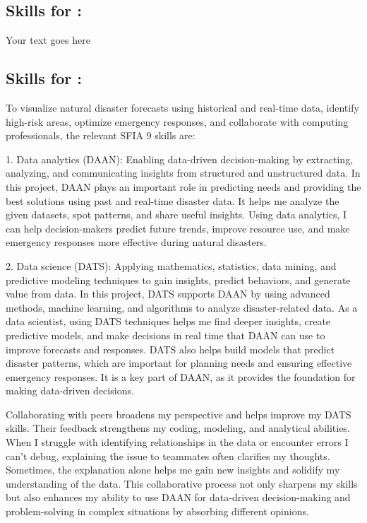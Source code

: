 \documentclass[a4paper, 11pt]{report}
\begin{document}
\subsection{Skills for \majA: \studA}

Your text goes here

\subsection{Skills for \majB: \studB}

To visualize natural disaster forecasts using historical and real-time data, identify high-risk areas, optimize emergency responses, and collaborate with computing professionals, the relevant SFIA 9 skills are:

1. Data analytics (DAAN): Enabling data-driven decision-making by extracting, analyzing, and communicating insights from structured and unstructured data. In this project, DAAN plays an important role in predicting needs and providing the best solutions using past and real-time disaster data. It helps me analyze the given datasets, spot patterns, and share useful insights. Using data analytics, I can help decision-makers predict future trends, improve resource use, and make emergency responses more effective during natural disasters.


2. Data science (DATS): Applying mathematics, statistics, data mining, and predictive modeling techniques to gain insights, predict behaviors, and generate value from data. In this project, DATS supports DAAN by using advanced methods, machine learning, and algorithms to analyze disaster-related data. As a data scientist, using DATS techniques helps me find deeper insights, create predictive models, and make decisions in real time that DAAN can use to improve forecasts and responses. DATS also helps build models that predict disaster patterns, which are important for planning needs and ensuring effective emergency responses. It is a key part of DAAN, as it provides the foundation for making data-driven decisions.

Collaborating with peers broadens my perspective and helps improve my DATS skills. Their feedback strengthens my coding, modeling, and analytical abilities. When I struggle with identifying relationships in the data or encounter errors I can't debug, explaining the issue to teammates often clarifies my thoughts. Sometimes, the explanation alone helps me gain new insights and solidify my understanding of the data. This collaborative process not only sharpens my skills but also enhances my ability to use DAAN for data-driven decision-making and problem-solving in complex situations by absorbing different opinions.
\end{document}
